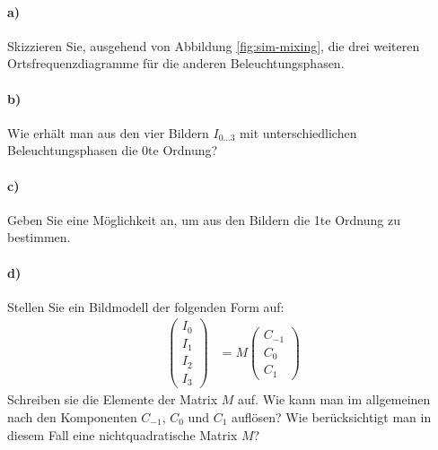 \documentclass{article}
\begin{document}
\paragraph{a)} 
Skizzieren Sie, ausgehend von Abbildung \ref{fig:sim-mixing}, die
drei weiteren Ortsfrequenzdiagramme f\"ur die anderen Beleuchtungsphasen.

\paragraph{b)} Wie erh\"alt man aus den vier Bildern $I_{0\ldots 3}$
mit unterschiedlichen Beleuchtungsphasen die 0te Ordnung?

\paragraph{c)} Geben Sie eine M\"oglichkeit an, um aus den Bildern die
1te Ordnung zu bestimmen.

\paragraph{d)} Stellen Sie ein Bildmodell der folgenden Form auf:
\begin{align}
\begin{pmatrix} I_0 \\ I_1 \\ I_2 \\ I_3 \end{pmatrix} &=
M 
\begin{pmatrix} C_{-1} \\ C_0 \\ C_1 \end{pmatrix} 
\end{align}
Schreiben sie die Elemente der Matrix $M$ auf. Wie kann man im
allgemeinen nach den Komponenten $C_{-1}$, $C_0$ und $C_1$ aufl\"osen?
Wie ber\"ucksichtigt man in diesem Fall eine nichtquadratische Matrix
$M$?




\end{document}
